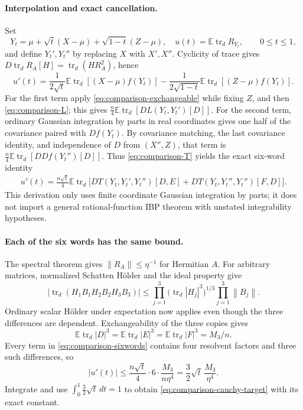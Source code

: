 \documentclass[11pt,a4paper]{article}
\newcommand{\norm}[1]{\left\lVert#1\right\rVert}
\DeclareMathOperator{\tr}{tr}
\begin{document}
\paragraph{Interpolation and exact cancellation.}
Set
\[
 Y_t=\mu+\sqrt t(X-\mu)+\sqrt{1-t}(Z-\mu),\quad
 u(t)=\mathbb E\tr_d R_{Y_t},\qquad0\le t\le1,
\]
and define $Y_t',Y_t''$ by replacing $X$ with $X',X''$.
Cyclicity of trace gives $D\tr_d R_A[H]=\tr_d(HR_A^2)$, hence
\[
 u'(t)=\frac1{2\sqrt t}\mathbb E\tr_d[(X-\mu)f(Y_t)]
       -\frac1{2\sqrt{1-t}}\mathbb E\tr_d[(Z-\mu)f(Y_t)].
\]
For the first term apply \eqref{eq:comparison-exchangeable} while fixing
$Z$, and then \eqref{eq:comparison-L}; this gives
$\frac n4\mathbb E\tr_d[D L(Y_t,Y_t')[D]]$.
For the second term, ordinary Gaussian integration by parts in real
coordinates gives one half of the covariance paired with $Df(Y_t)$.
By covariance matching, the last covariance identity, and independence
of $D$ from $(X'',Z)$, that term is
$\frac n4\mathbb E\tr_d[D Df(Y_t'')[D]]$.
Thus \eqref{eq:comparison-T} yields the exact six-word identity
\begin{align}\label{eq:comparison-sixwords}
 u'(t)=\frac{n\sqrt t}{4}\mathbb E\tr_d\bigl[
 D T(Y_t,Y_t',Y_t'')[D,E]
 +D T(Y_t,Y_t'',Y_t'')[F,D]\bigr].
\end{align}
This derivation only uses finite coordinate Gaussian integration by parts;
it does not import a general rational-function IBP theorem with unstated
integrability hypotheses.

\paragraph{Each of the six words has the same bound.}
The spectral theorem gives $\norm{R_A}\le\eta^{-1}$ for Hermitian $A$.
For arbitrary matrices, normalized Schatten H\"older and the ideal property
give
\[
 |\tr_d(H_1B_1H_2B_2H_3B_3)|
 \le\prod_{j=1}^3\bigl(\tr_d|H_j|^3\bigr)^{1/3}
                 \prod_{j=1}^3\norm{B_j}.
\]
Ordinary scalar H\"older under expectation now applies even though the
three differences are dependent.  Exchangeability of the three copies
gives
\[
 \mathbb E\tr_d|D|^3=\mathbb E\tr_d|E|^3
   =\mathbb E\tr_d|F|^3=M_3/n.
\]
Every term in \eqref{eq:comparison-sixwords} contains four resolvent
factors and three such differences, so
\[
 |u'(t)|\le\frac{n\sqrt t}{4}\cdot6\cdot
                  \frac{M_3}{n\eta^4}
             =\frac32\sqrt t\,\frac{M_3}{\eta^4}.
\]
Integrate and use $\int_0^1\frac32\sqrt t\,dt=1$ to obtain
\eqref{eq:comparison-cauchy-target} with its exact constant.
\end{document}
